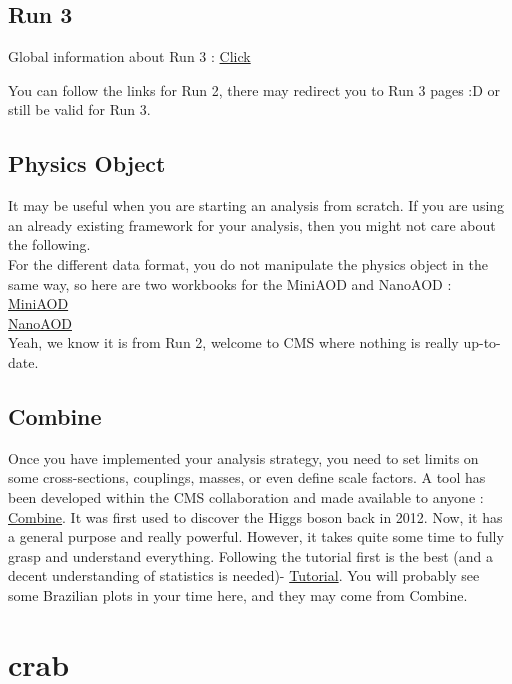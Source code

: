 \documentclass[reprint, a4paper, nofootinbib, amsmath, amssymb, aps]{revtex4-1}
\begin{document}
\subsection{Run 3}
    Global information about Run 3 : \href{https://twiki.cern.ch/twiki/bin/view/CMS/PdmVRun3Analysis#Run_3_Analysis}{Click}

    You can follow the links for Run 2, there may redirect you to Run 3 pages :D or still be valid for Run 3.
\subsection{Physics Object}
    It may be useful when you are starting an analysis from scratch. If you are using an already existing framework for your analysis, then you might not care about the following. \\
    For the different data format, you do not manipulate the physics object in the same way, so here are two workbooks for the MiniAOD and NanoAOD : \\
    \href{https://twiki.cern.ch/twiki/bin/view/CMSPublic/WorkBookMiniAOD2017}{MiniAOD}\\
    \href{https://twiki.cern.ch/twiki/bin/view/CMSPublic/WorkBookNanoAOD}{NanoAOD}\\
    Yeah, we know it is from Run 2, welcome to CMS where nothing is really up-to-date.



\subsection{Combine}


    Once you have implemented your analysis strategy, you need to set limits on some cross-sections, couplings, masses, or even define scale factors. A tool has been developed within the CMS collaboration and made available to anyone : \href{https://cms-analysis.github.io/HiggsAnalysis-CombinedLimit/latest/}{Combine}. It was first used to discover the Higgs boson back in 2012. Now, it  has a general purpose and really powerful. However, it takes quite some time to fully grasp and understand everything. Following the tutorial first is the best (and a decent understanding of statistics is needed)- \href{https://cms-analysis.github.io/HiggsAnalysis-CombinedLimit/latest/part5/longexercise/}{Tutorial}. You will probably see some Brazilian plots in your time here, and they may come from Combine.

\section{crab}
\end{document}
